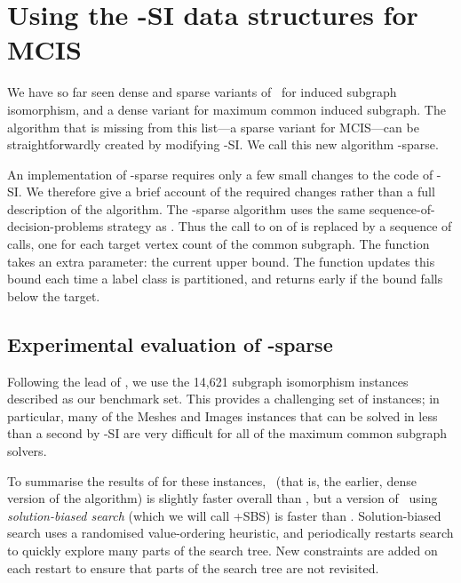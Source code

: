 \FloatBarrier

\section{Using the \McSplit-SI data structures for MCIS}\label{sec:mcsplit-sparse}

We have so far seen dense and sparse variants of \McSplit\ for induced subgraph isomorphism, and
a dense variant for maximum common induced subgraph.  The algorithm that is missing from this
list---a sparse variant for MCIS---can be straightforwardly created by modifying \McSplit-SI. 
We call this new algorithm \McSplit-sparse.

An implementation of \McSplit-sparse
requires only a few small changes to the code of \McSplit-SI. We
therefore give a brief account of the required changes rather than a full
description of the algorithm.  The \McSplit-sparse algorithm uses the same
sequence-of-decision-problems strategy as \McSplitDown. Thus the call to
 on  of 
is replaced by a sequence of calls, one for each target
vertex count of the common
subgraph.  The  function takes an extra parameter: the current
upper bound. The  function updates this bound each time a label
class is partitioned, and returns early if the bound falls below the target.

\subsection{Experimental evaluation of \McSplit-sparse}

Following the lead of \cite{DBLP:conf/cpaior/ArchibaldDHMP019},
we use the 14,621 subgraph isomorphism instances described
 as our benchmark set.
This provides a challenging set of instances; in particular,
many of the Meshes and Images instances that can be solved in less
than a second by \McSplit-SI are very difficult for all of the maximum
common subgraph solvers.

To summarise the results of \cite{DBLP:conf/cpaior/ArchibaldDHMP019}
for these instances, \McSplitDown\ (that is, the earlier, dense version
of the algorithm) is slightly faster overall than
\kDown, but a version of \kDown\ using \emph{solution-biased
search} (which we will call \kDown+SBS) is faster than
\McSplitDown.  Solution-biased search uses a randomised value-ordering
heuristic, and periodically restarts search to quickly
explore many parts of the search tree.  New constraints are added
on each restart to ensure that parts of the search tree are not
revisited.

